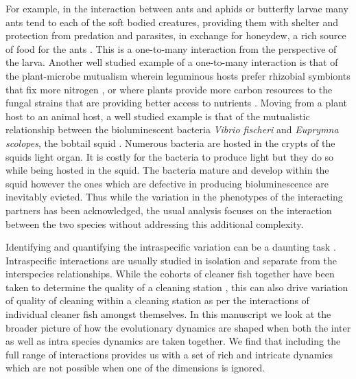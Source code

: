 \documentclass[12pt]{article}
\begin{document}
For example, in the interaction between ants and aphids or butterfly larvae \citep{pierce:BES:1987,hoelldobler:book:1990} many ants tend to each of the soft bodied creatures, providing them with shelter and protection from predation and parasites, in exchange for honeydew, a rich source of food for the ants \citep{hill:OEC:1989,stadler:book:2008}.
This is a one-to-many interaction from the perspective of the larva.
Another well studied example of a one-to-many interaction is that of the plant-microbe mutualism wherein leguminous hosts prefer rhizobial symbionts that fix more nitrogen \citep{kiers:Nature:2003}, or where plants provide more carbon resources to the fungal strains that are providing better access to nutrients \citep{kiers:Science:2011}.
Moving from a plant host to an animal host, a well studied example is that of the mutualistic relationship between the bioluminescent bacteria \textit{Vibrio fischeri} and \textit{Euprymna scolopes}, the bobtail squid \citep{mcfallngai:PLoSB:2014}.
Numerous bacteria are hosted in the crypts of the squids light organ.
It is costly for the bacteria to produce light but they do so while being hosted in the squid.
The bacteria mature and develop within the squid however the ones which are defective in producing bioluminescence are inevitably evicted.
Thus while the variation in the phenotypes of the interacting partners has been acknowledged, the usual analysis focuses on the interaction between the two species without addressing this additional complexity.

Identifying and quantifying the intraspecific variation can be a daunting task \citep{behm:JE:2014}.
Intraspecific interactions are usually studied in isolation and separate from the interspecies relationships. 
While the cohorts of cleaner fish together have been taken to determine the quality of a cleaning station \citep{bshary:AB:2002,bshary:book:2003}, this can also drive variation of quality of cleaning within a cleaning station as per the interactions of individual cleaner fish amongst themselves.
In this manuscript we look at the broader picture of how the evolutionary dynamics are shaped when both the inter as well as intra species dynamics are taken together.
We find that including the full range of interactions provides us with a set of rich and intricate dynamics which are not possible when one of the dimensions is ignored.
\end{document}
